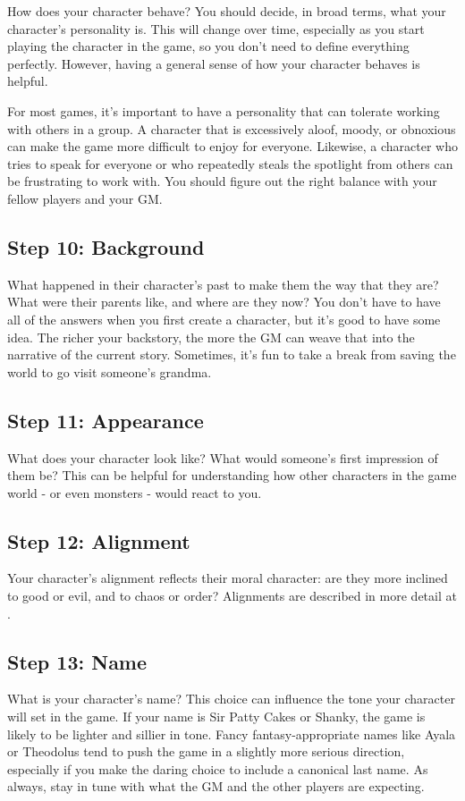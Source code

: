         How does your character behave?
        You should decide, in broad terms, what your character's personality is.
        This will change over time, especially as you start playing the character in the game, so you don't need to define everything perfectly.
        However, having a general sense of how your character behaves is helpful.

        For most games, it's important to have a personality that can tolerate working with others in a group.
        A character that is excessively aloof, moody, or obnoxious can make the game more difficult to enjoy for everyone.
        Likewise, a character who tries to speak for everyone or who repeatedly steals the spotlight from others can be frustrating to work with.
        You should figure out the right balance with your fellow players and your GM.\@

    \subsection{Step 10: Background}
        What happened in their character's past to make them the way that they are?
        What were their parents like, and where are they now?
        You don't have to have all of the answers when you first create a character, but it's good to have some idea.
        The richer your backstory, the more the GM can weave that into the narrative of the current story.
        Sometimes, it's fun to take a break from saving the world to go visit someone's grandma.

    \subsection{Step 11: Appearance}
        What does your character look like?
        What would someone's first impression of them be?
        This can be helpful for understanding how other characters in the game world - or even monsters - would react to you.

    \subsection{Step 12: Alignment}
        Your character's alignment reflects their moral character: are they more inclined to good or evil, and to chaos or order?
        Alignments are described in more detail at .

    \subsection{Step 13: Name}
        What is your character's name?
        This choice can influence the tone your character will set in the game.
        If your name is Sir Patty Cakes or Shanky, the game is likely to be lighter and sillier in tone.
        Fancy fantasy-appropriate names like Ayala or Theodolus tend to push the game in a slightly more serious direction, especially if you make the daring choice to include a canonical last name.
        As always, stay in tune with what the GM and the other players are expecting.

